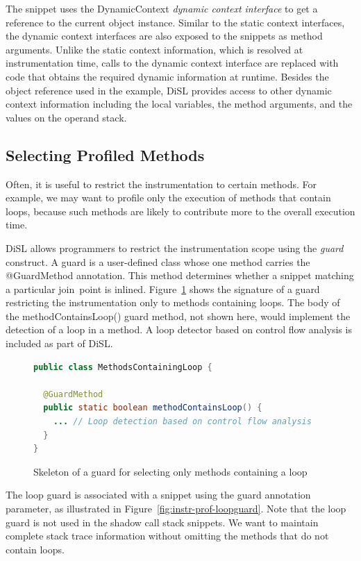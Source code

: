 \documentclass{article}
\newcommand{\brcode}[1]{\textsf{#1}}
\newcommand{\code}[1]{\mbox{\brcode{#1}}}
\begin{document}
The snippet uses the \code{DynamicContext} \emph{dynamic context interface} to get a reference to the current object instance.
Similar to the static context interfaces, the dynamic context interfaces are also exposed to the snippets as method arguments.
Unlike the static context information, which is resolved at instrumentation time, calls to the dynamic context interface are replaced with code that obtains the required dynamic information at runtime.
Besides the object reference used in the example, DiSL provides access to other dynamic context information including the local variables, the method arguments, and the values on the operand stack.


\subsection{Selecting Profiled Methods}

Often, it is useful to restrict the instrumentation to certain methods.
For example, we may want to profile only the execution of methods that contain loops, because such methods are likely to contribute more to the overall execution time.

DiSL allows programmers to restrict the instrumentation scope using the \emph{guard} construct.
A guard is a user-defined class whose one method carries the \code{@GuardMethod} annotation.
This method determines whether a snippet matching a particular join~point is inlined.
Figure~\ref{fig:instr-guard} shows the signature of a guard restricting the instrumentation only to methods containing loops.
The body of the \code{methodContainsLoop()} guard method, not shown here, would implement the detection of a loop in a method.
A loop detector based on control flow analysis is included as part of DiSL.

\begin{figure}[h!]
\smaller
\begin{lstlisting}[language=Java]
public class MethodsContainingLoop {

  @GuardMethod
  public static boolean methodContainsLoop() {
    ... // Loop detection based on control flow analysis
  }
}
\end{lstlisting}
\caption{Skeleton of a guard for selecting only methods containing a loop}
\label{fig:instr-guard}
\end{figure}

The loop guard is associated with a snippet using the \code{guard} annotation parameter, as illustrated in Figure~\ref{fig:instr-prof-loopguard}.
Note that the loop guard is not used in the shadow call stack snippets.
We want to maintain complete stack trace information without omitting the methods that do not contain loops.
\end{document}
